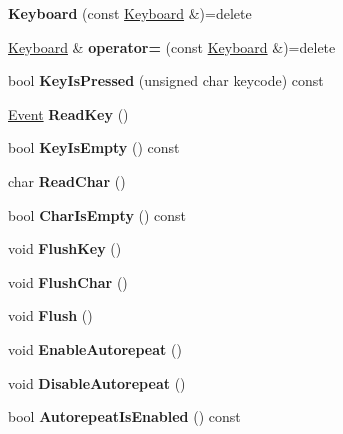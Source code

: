 \begin{DoxyCompactItemize}
\item 
\mbox{\label{class_keyboard_ac49018ea350ec1d21227e0721e796d51}} 
{\bfseries Keyboard} (const \hyperlink{class_keyboard}{Keyboard} \&)=delete
\item 
\mbox{\label{class_keyboard_a494c29997ced4b9fe28fef8e0c2c34ae}} 
\hyperlink{class_keyboard}{Keyboard} \& {\bfseries operator=} (const \hyperlink{class_keyboard}{Keyboard} \&)=delete
\item 
\mbox{\label{class_keyboard_a7b11ba07982539a0dd9b16b4706e7211}} 
bool {\bfseries Key\+Is\+Pressed} (unsigned char keycode) const
\item 
\mbox{\label{class_keyboard_a1aabaaff8f5a031317966ca0bfac7858}} 
\hyperlink{class_keyboard_1_1_event}{Event} {\bfseries Read\+Key} ()
\item 
\mbox{\label{class_keyboard_ad7339a4454f6f55c19b235a9dbe62c97}} 
bool {\bfseries Key\+Is\+Empty} () const
\item 
\mbox{\label{class_keyboard_a1391159e0795e9f53abc626425df9c71}} 
char {\bfseries Read\+Char} ()
\item 
\mbox{\label{class_keyboard_a9ab0db1fa20fd0b9c438af76fdf1521c}} 
bool {\bfseries Char\+Is\+Empty} () const
\item 
\mbox{\label{class_keyboard_a0c3af372824a60360d0476c3b92bdbfb}} 
void {\bfseries Flush\+Key} ()
\item 
\mbox{\label{class_keyboard_a430a9e57d9bf9cfd639ceb38211dd300}} 
void {\bfseries Flush\+Char} ()
\item 
\mbox{\label{class_keyboard_a160a53a30e54a6707b17476c4199b0e9}} 
void {\bfseries Flush} ()
\item 
\mbox{\label{class_keyboard_a0e6e57b51d1f406d11be57797bd39b24}} 
void {\bfseries Enable\+Autorepeat} ()
\item 
\mbox{\label{class_keyboard_af36db207d29ac5ba24612892cd457289}} 
void {\bfseries Disable\+Autorepeat} ()
\item 
\mbox{\label{class_keyboard_ae436c8a4dda6c694e909c6f63729b2d4}} 
bool {\bfseries Autorepeat\+Is\+Enabled} () const
\end{DoxyCompactItemize}
